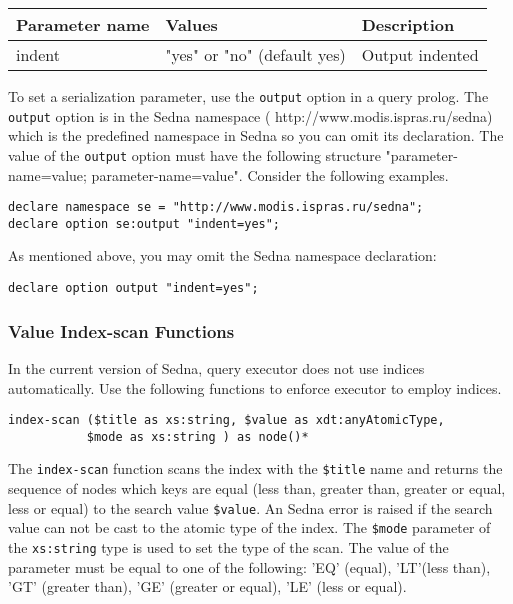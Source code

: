 \documentclass[a4paper,12pt]{article}
\begin{document}
\begin{tabular}{|l|l|l|}
\hline
Parameter name & Values & Description \\
\hline
\hline
indent & "yes" or "no" (default yes) & Output indented \\
\hline
\end{tabular}

To set a serialization parameter, use the \verb!output! option in a query prolog. The \verb!output! option is in the Sedna namespace (
http://www.modis.ispras.ru/sedna) which is the predefined namespace in Sedna so you can omit its declaration. The value of the \verb!output! option must have the following structure "parameter-name=value; parameter-name=value". Consider the following examples.

\begin{verbatim}
declare namespace se = "http://www.modis.ispras.ru/sedna";
declare option se:output "indent=yes";
\end{verbatim}

As mentioned above, you may omit the Sedna namespace declaration:
\begin{verbatim}
declare option output "indent=yes";
\end{verbatim}

\subsubsection{Value Index-scan Functions}
\label{sec:value-index-scan-fun}
In the current version of Sedna, query executor does not use indices
automatically. Use the following functions to enforce executor to employ
indices.

\begin{verbatim}
index-scan ($title as xs:string, $value as xdt:anyAtomicType,
           $mode as xs:string ) as node()*
\end{verbatim}

The \verb!index-scan! function scans the index with the \verb!$title!
name and returns the sequence of nodes which keys are equal (less than,
greater than, greater or equal, less or equal) to the search value
\verb!$value!. An Sedna error is raised if the search value can not be cast to
the atomic type of the index. The \verb!$mode! parameter of the
\verb!xs:string! type is used to set the type of the scan. The value of the
parameter must be equal to one of the following: 'EQ' (equal), 'LT'(less than),
'GT' (greater than), 'GE' (greater or equal), 'LE' (less or equal).
\end{document}
